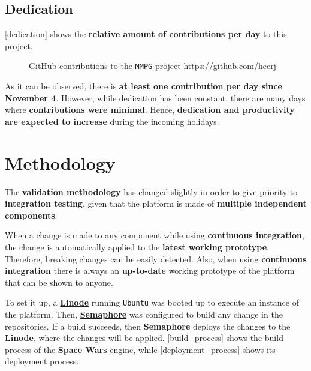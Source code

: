 \documentclass[a4paper,11pt]{article}
\begin{document}
\subsection{Dedication}
\autoref{dedication} shows the \textbf{relative amount of contributions per day} to this project.
\begin{figure}[H]
\caption{GitHub contributions to the \texttt{MMPG} project \url{https://github.com/hecrj}}
\label{dedication}
\end{figure}
As it can be observed, there is \textbf{at least one contribution per day since November 4}. However, while dedication has
been constant, there are many days where \textbf{contributions were minimal}. Hence, \textbf{dedication and productivity are expected
to increase} during the incoming holidays.
\clearpage
\section{Methodology}
\label{methodology}
The \textbf{validation methodology} has changed slightly in order to give priority to \textbf{integration testing}, given that
the platform is made of \textbf{multiple independent components}.

When a change is made to any component while using \textbf{continuous integration}, the change is automatically applied to
the \textbf{latest working prototype}. Therefore, breaking changes can be easily detected. Also, when using  \textbf{continuous
integration} there is always an \textbf{up-to-date} working prototype of the platform that can be shown to anyone.

To set it up, a \href{http://linode.com/}{\textbf{Linode}} running \texttt{Ubuntu} was booted up to execute an instance of
the platform. Then, \href{http://semaphoreci.com/}{\textbf{Semaphore}} was configured to build any change in the
repositories. If a build succeeds, then \textbf{Semaphore} deploys the changes to the \textbf{Linode}, where the changes will
be applied. \autoref{build_process} shows the build process of the \textbf{Space Wars} engine, while
\autoref{deployment_process} shows its deployment process.
\end{document}
